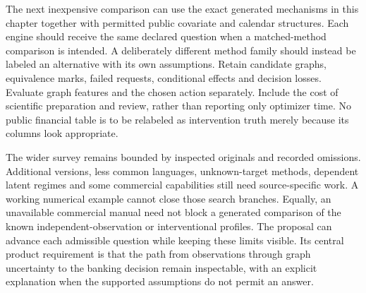 The next inexpensive comparison can use the exact generated mechanisms in
this chapter together with permitted public covariate and calendar structures.
Each engine should receive the same declared question when a matched-method
comparison is intended. A deliberately different method family should instead
be labeled an alternative with its own assumptions. Retain candidate graphs,
equivalence marks, failed requests, conditional effects and decision losses.
Evaluate graph features and the chosen action separately. Include the cost of
scientific preparation and review, rather than reporting only optimizer time.
No public financial table is to be relabeled as intervention truth merely
because its columns look appropriate. \citep{exec16_s2_design}

The wider survey remains bounded by inspected originals and recorded
omissions. Additional versions, less common languages, unknown-target methods,
dependent latent regimes and some commercial capabilities still need
source-specific work. A working numerical example cannot close those search
branches. Equally, an unavailable commercial manual need not block a generated
comparison of the known independent-observation or interventional profiles.
The proposal can advance each admissible question while keeping these limits
visible. Its central product requirement is that the path from observations
through graph uncertainty to the banking decision remain inspectable, with
an explicit explanation when the supported assumptions do not permit an
answer. \citep{exec16_s2_design}
\label{exec16:s2-end}

